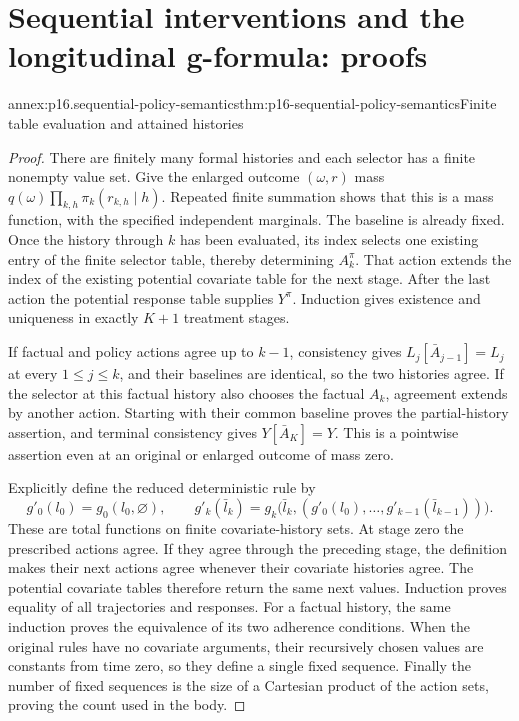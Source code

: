 \section{Sequential interventions and the longitudinal g-formula: proofs}
\label{sec:annex-p16-sequential-g-formula}

\begin{annexitem}{annex:p16.sequential-policy-semantics}{thm:p16-sequential-policy-semantics}{Finite table evaluation and attained histories}
\begin{proof}
There are finitely many formal histories and each selector has a finite
nonempty value set. Give the enlarged outcome \((\omega,r)\) mass
\(q(\omega)\prod_{k,h}\pi_k(r_{k,h}\mid h)\). Repeated finite summation
shows that this is a mass function, with the specified independent marginals.
The baseline is already fixed. Once the history through \(k\) has been
evaluated, its index selects one existing entry of the finite selector
table, thereby determining \(A_k^\pi\). That action extends the index of
the existing potential covariate table for the next stage. After the last
action the potential response table supplies \(Y^\pi\). Induction gives
existence and uniqueness in exactly \(K+1\) treatment stages.

If factual and policy actions agree up to \(k-1\), consistency gives
\(L_j[\bar A_{j-1}]=L_j\) at every \(1\leq j\leq k\), and their
baselines are identical, so the two histories
agree. If the selector at this factual history also chooses the factual
\(A_k\), agreement extends by another action. Starting with their common
baseline proves the partial-history assertion, and terminal consistency
gives \(Y[\bar A_K]=Y\). This is a pointwise assertion even at an original
or enlarged outcome of mass zero.

Explicitly define the reduced deterministic rule by
\[
 g'_0(l_0)=g_0(l_0,\varnothing),\qquad
 g'_k(\bar l_k)=g_k\bigl(\bar l_k,
     (g'_0(l_0),\ldots,g'_{k-1}(\bar l_{k-1}))\bigr).
\]
These are total functions on finite covariate-history sets. At stage zero
the prescribed actions agree. If they agree through the preceding stage,
the definition makes their next actions agree whenever their covariate
histories agree. The potential covariate tables therefore return the same
next values. Induction proves equality of all trajectories and responses.
For a factual history, the same induction proves the equivalence of its
two adherence conditions. When the original rules have no covariate
arguments, their recursively chosen values are constants from time zero,
so they define a single fixed sequence. Finally the number of fixed
sequences is the size of a Cartesian product of the action sets, proving
the count used in the body.
\end{proof}
\end{annexitem}

